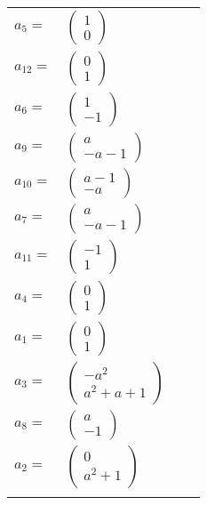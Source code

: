 \documentclass[1p]{elsarticle_modified}
\theoremstyle{definition}
\begin{document}
\begin{tabular}{m{7pt} m{180pt} m{7pt} m{180pt} }
\flushright $a_{5}=$&$\begin{pmatrix}1\\0\end{pmatrix}$ \\
\flushright $a_{12}=$&$\begin{pmatrix}0\\1\end{pmatrix}$ \\
\flushright $a_{6}=$&$\begin{pmatrix}1\\-1\end{pmatrix}$ \\
\flushright $a_{9}=$&$\begin{pmatrix}a\\- a-1\end{pmatrix}$ \\
\flushright $a_{10}=$&$\begin{pmatrix}a-1\\- a\end{pmatrix}$ \\
\flushright $a_{7}=$&$\begin{pmatrix}a\\- a-1\end{pmatrix}$ \\
\flushright $a_{11}=$&$\begin{pmatrix}-1\\1\end{pmatrix}$ \\
\flushright $a_{4}=$&$\begin{pmatrix}0\\1\end{pmatrix}$ \\
\flushright $a_{1}=$&$\begin{pmatrix}0\\1\end{pmatrix}$ \\
\flushright $a_{3}=$&$\begin{pmatrix}- a^2\\a^2+a+1\end{pmatrix}$ \\
\flushright $a_{8}=$&$\begin{pmatrix}a\\-1\end{pmatrix}$ \\
\flushright $a_{2}=$&$\begin{pmatrix}0\\a^2+1\end{pmatrix}$\\&\end{tabular}
\end{document}
